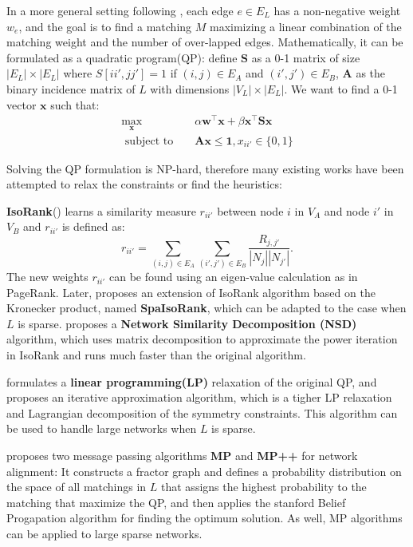 \documentclass[11pt,letterpaper]{article}
\begin{document}
In a more general setting following \cite{Singh2007}, each edge $e \in E_L$ has a non-negative weight $w_e$, and the goal is to find a matching $M$ maximizing a linear combination of the matching weight and the number of over-lapped edges. Mathematically, it can be formulated as a quadratic program(QP): define $\mathbf{S}$ as a 0-1 matrix of size $|E_L| \times |E_L|$ where $S[ii',  jj'] = 1$ if $(i, j) \in E_A$ and $(i', j') \in E_B$, $\mathbf{A}$ as the binary incidence matrix of $L$ with dimensions $|V_L| \times |E_L|$. We want to find a 0-1 vector $\mathbf{x}$ such that:
\begin{eqnarray*}
      \max_{\mathbf{x}} & & {\alpha \mathbf{w}^{\intercal}\mathbf{x} + \beta \mathbf{x}^{\intercal}\mathbf{S}\mathbf{x}} \\
      \text{ subject to  } & &  \mathbf{A}\mathbf{x} \leq \mathbf{1}, x_{ii'} \in \{0, 1\}
\end{eqnarray*}

Solving the QP formulation is NP-hard, therefore many existing works have been attempted to relax the constraints or find the heuristics:

\textbf{IsoRank}(\cite{Singh2008}) learns a similarity measure $r_{ii'}$ between node $i$ in $V_A$ and node $i'$ in $V_B$ and $r_{ii'}$ is defined as:
   \begin{equation*}
           r_{ii'} = \sum_{(i, j) \in E_A}{\sum_{(i', j') \in E_B}{\frac{R_{j, j'}}{|N_j||N_{j'}|}}}.
   \end{equation*}
The new weights $r_{ii'}$ can be found using an eigen-value calculation as in PageRank. Later, \cite{Bayati2009a} proposes an extension of IsoRank algorithm based on the Kronecker product, named \textbf{SpaIsoRank}, which can be adapted to the case when $L$ is sparse. \cite{Kollias2011} proposes a \textbf{Network Similarity Decomposition (NSD)} algorithm, which uses matrix decomposition to approximate the power iteration in IsoRank and runs much faster than the original algorithm.

\cite{Klau2009} formulates a \textbf{linear programming(LP)} relaxation of the original QP, and proposes an iterative approximation algorithm, which is a tigher LP relaxation and Lagrangian decomposition of the symmetry constraints. This algorithm can be used to handle large networks when $L$ is sparse.

\cite{Bayati2009a} proposes two message passing algorithms \textbf{MP} and \textbf{MP++} for network alignment: It constructs a fractor graph and defines a probability distribution on the space of all matchings in $L$ that assigns the highest probability to the matching that maximize the QP, and then applies the stanford Belief Progapation algorithm for finding the optimum solution. As well, MP algorithms can be applied to large sparse networks.
\end{document}
